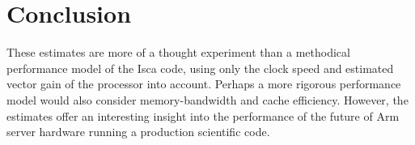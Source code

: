 \documentclass[a4paper,11pt]{report}
\begin{document}

\section{Conclusion}
These estimates are more of a thought experiment than a methodical performance model of the Isca code, using only the clock speed and estimated vector gain of the processor into account. Perhaps a more rigorous performance model would also consider memory-bandwidth and cache efficiency. However, the estimates offer an interesting insight into the performance of the future of Arm server hardware running a production scientific code. 






%
%
%
%
\end{document}
